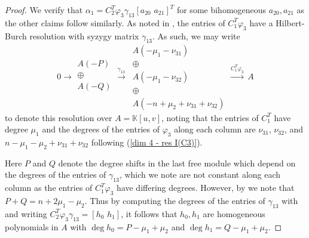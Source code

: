 \documentclass[reqno]{amsart}
\numberwithin{equation}{section}
\theoremstyle{definition}
\def\K{\mathbb{K}}
\begin{document}
\begin{proof}
    We verify that $\alpha_1=C_2^T \varphi_3\gamma_{13}[a_{20}\,\,a_{21}]^T$ for some bihomogeneous $a_{20}, a_{21}$ as the other claims follow similarly. As noted in , the entries of $C_1^T\varphi_3$ have a Hilbert-Burch resolution with syzygy matrix $\gamma_{13}$. As such, we may write
\begin{equation}\label{dim 4 - res C_1^Tvarphi_3}
 0 \longrightarrow \begin{array}{c}
 A(-P)\\
 \oplus \\
A(-Q)\\
\end{array} \overset{\gamma_{13}}{\longrightarrow} \,
\begin{array}{c}
 A(-\mu_1-\nu_{31})\\
 \oplus \\
A(-\mu_1 -\nu_{32})\\
\oplus\\
A(-n+\mu_2+\nu_{31}+\nu_{32})
\end{array}
\overset{C_1^T\varphi_3}{\longrightarrow} \,
A
\end{equation}
to denote this resolution over $A=\K[u,v]$, noting that the entries of $C_1^T$ have degree $\mu_1$ and the degrees of the entries of $\varphi_3$ along each column are $\nu_{31}$, $\nu_{32}$, and $n-\mu_1-\mu_2+\nu_{31}+\nu_{32}$ following (\ref{dim 4 - res I(C3)}).

Here $P$ and $Q$ denote the degree shifts in the last free module which depend on the degrees of the entries of $\gamma_{13}$, which we note are not constant along each column as the entries of $C_1^T\varphi_3$ have differing degrees. However, by  we note that $P+Q= n+2\mu_1-\mu_2$. Thus by computing the degrees of the entries of $\gamma_{13}$ with  and writing $C_2^T \varphi_3\gamma_{13} = [h_0\,\, h_1]$, it follows that $h_0, h_1$ are homogeneous polynomials in $A$ with $\deg h_0 = P-\mu_1+\mu_2$ and $\deg h_1 = Q-\mu_1+\mu_2$.


\end{proof}
\end{document}

